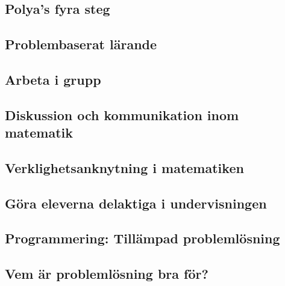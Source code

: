 \documentclass[11pt,a4paper]{article}
\begin{document}
    \subsection{Polya's fyra steg}
        \label{sec:polya}
        
        
    \subsection{Problembaserat lärande}
        \label{sec:pbl}
        
        
    \subsection{Arbeta i grupp}
        \label{sec:Arbetaigrupp}
        
        
    \subsection{Diskussion och kommunikation inom matematik}
        
        \label{sec:Diskussion}
        
    \subsection{Verklighetsanknytning i matematiken}
        \label{sec:Verklighetsanknytning}
        
        
    \subsection{Göra eleverna delaktiga i undervisningen}
        
        \label{sec:delaktighet}
        
    \subsection{Programmering: Tillämpad problemlösning}
        \label{sec:ProgrammeringOchMatematik}
        
        
    \subsection{Vem är problemlösning bra för?}
        
    
\end{document}

